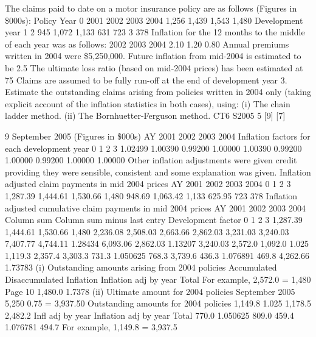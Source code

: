 \documentclass[a4paper,12pt]{article}
\begin{document}
 


The claims paid to date on a motor insurance policy are as follows (Figures in \$000s):
Policy Year 0
2001
2002
2003
2004 1,256
1,439
1,543
1,480
Development year
1
2
945
1,072
1,133
631
723
3
378
Inflation for the 12 months to the middle of each year was as follows:
2002
2003
2004
2.10%
1.20%
0.80%
Annual premiums written in 2004 were \$5,250,000.
Future inflation from mid-2004 is estimated to be 2.5%
The ultimate loss ratio (based on mid-2004 prices) has been estimated at 75%
Claims are assumed to be fully run-off at the end of development year 3.
Estimate the outstanding claims arising from policies written in 2004 only (taking
explicit account of the inflation statistics in both cases), using:
(i) The chain ladder method.
(ii) The Bornhuetter-Ferguson method.
CT6 S2005
5
[9]
[7]



9
September 2005
(Figures in \$000s)
AY
2001
2002
2003
2004
Inflation factors for each development year
0
1
2
3
1.02499
1.00390
0.99200
1.00000
1.00390
0.99200
1.00000
0.99200
1.00000
1.00000
Other inflation adjustments were given credit providing they were sensible, consistent and
some explanation was given.
Inflation adjusted claim payments in mid 2004
prices
AY
2001
2002
2003
2004
0 1 2 3
1,287.39
1,444.61
1,530.66
1,480 948.69
1,063.42
1,133 625.95
723 378
Inflation adjusted cumulative claim payments in
mid 2004 prices
AY
2001
2002
2003
2004
Column sum
Column sum minus last entry
Development factor
0 1 2 3
1,287.39
1,444.61
1,530.66
1,480 2,236.08
2,508.03
2,663.66 2,862.03
3,231.03 3,240.03
7,407.77
4,744.11
1.28434 6,093.06
2,862.03
1.13207 3,240.03
2,572.0
1,092.0
1.025
1,119.3
2,357.4 3,303.3
731.3
1.050625
768.3 3,739.6
436.3
1.076891
469.8
4,262.66
1.73783
(i)
Outstanding amounts arising from 2004 policies
Accumulated
Disaccumulated
Inflation
Inflation adj by year
Total
For example, 2,572.0 = 1,480
Page 10
1,480.0
1.7378%
(ii)
Ultimate amount for 2004 policies
September 2005
5,250
0.75 = 3,937.50
Outstanding amounts for 2004 policies
1,149.8
1.025
1,178.5
2,482.2
Infl adj by year
Inflation adj by year
Total
770.0
1.050625
809.0
459.4
1.076781
494.7
For example,
1,149.8 = 3,937.5
\end{document}
